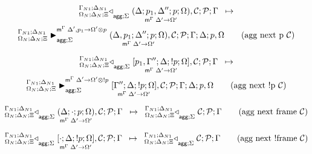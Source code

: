 
\begin{multline}
\transx{
   \contstatea{\Delta_N}{\lframe{\Delta}{p_1, \Delta''}{p}{\Omega}{\Delta'}{\Omega'}, \lstack{C} ; \lstack{P}}{\Gamma}{\Sigma}
}
{
   \matstatea{\Delta_N}{\lframe{\Delta,
      p_1}{\Delta''}{p}{\Omega}{\Delta'}{\Omega'}, \lstack{C}; \lstack{P}}{\Gamma}{\Delta}{p,
      \Omega}{\Delta', p_1 \rightarrow \Omega' \otimes p}{\Sigma}
} \tag{agg next p $\lstack{C}$}
\end{multline}

\begin{multline}
\transx{
   \contstatea{\Delta_N}{\pframe{p_1, \Gamma''}{\Delta}{\bang
   p}{\Omega}{\Delta'}{\Omega'}, \lstack{C} ; \lstack{P}}{\Gamma}{\Sigma}
}
{
   \matstatea{\Delta_N}{\pframe{\Gamma''}{\Delta}{\bang p}
      {\Omega}{\Delta'}{\Omega'}, \lstack{C}; \lstack{P}}{\Gamma}{\Delta}{p,
      \Omega}{\Delta' \rightarrow \Omega' \otimes \bang p}{\Sigma}
} \tag{agg next \bang p $\lstack{C}$}
\end{multline}

\[
\trans{
   \contstatea{\Delta_N}{\lframe{\Delta}{\cdot}{p}{\Omega}{\Delta'}{\Omega'}, \lstack{C} ; \lstack{P}}{\Gamma}{\Sigma}
}
{
   \contstatea{\Delta_N}{\lstack{C} ; \lstack{P}}{\Gamma}{\Sigma}
} \tag{agg  next frame $\lstack{C}$}
\]

\[
\trans{
   \contstatea{\Delta_N}{\pframe{\cdot}{\Delta}{\bang
   p}{\Omega}{\Delta'}{\Omega'}, \lstack{C} ; \lstack{P}}{\Gamma}{\Sigma}
}
{
   \contstatea{\Delta_N}{\lstack{C} ; \lstack{P}}{\Gamma}{\Sigma}
} \tag{agg next \bang frame $\lstack{C}$}
\]
